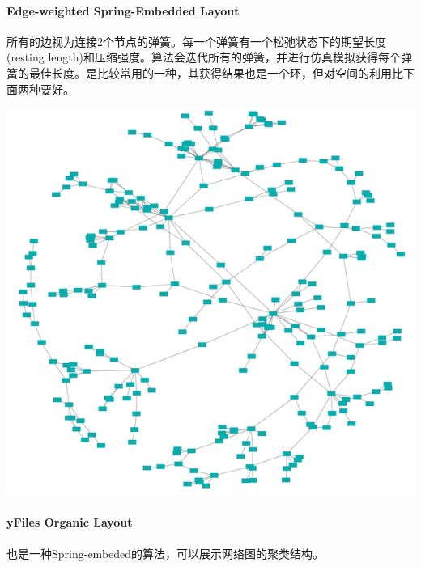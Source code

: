 \documentclass[]{article}
\numberwithin{figure}{section}
\numberwithin{table}{section}
\theoremstyle{definition}
\theoremstyle{definition}
\theoremstyle{definition}
\theoremstyle{remark}
\begin{document}
\paragraph{Edge-weighted Spring-Embedded
Layout}\label{edge-weighted-spring-embedded-layout}

所有的边视为连接2个节点的弹簧。每一个弹簧有一个松弛状态下的期望长度
(resting
length)和压缩强度。算法会迭代所有的弹簧，并进行仿真模拟获得每个弹簧的最佳长度。是比较常用的一种，其获得结果也是一个环，但对空间的利用比下面两种要好。

\begin{center}\includegraphics[width=0.95\linewidth,height=0.7\textheight,keepaspectratio]{images/spring} \end{center}

\paragraph{yFiles Organic Layout}\label{yfiles-organic-layout}

也是一种Spring-embeded的算法，可以展示网络图的聚类结构。
\end{document}
